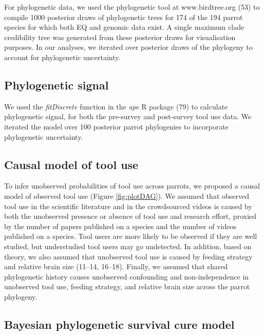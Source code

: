 \documentclass[
  man, donotrepeattitle,floatsintext]{apa6}
\begin{document}
For phylogenetic data, we used the phylogenetic tool at www.birdtree.org
(53) to compile 1000 posterior draws of phylogenetic trees for 174 of the
194 parrot species for which both EQ and genomic data exist. A single maximum
clade credibility tree was generated from these posterior draws for
visualisation purposes. In our analyses, we iterated over posterior draws of the
phylogeny to account for phylogenetic uncertainty.

\hypertarget{phylogenetic-signal}{%
\subsection{Phylogenetic signal}\label{phylogenetic-signal}}

We used the \emph{fitDiscrete} function in the \emph{ape} R package (79) to
calculate phylogenetic signal, for both the pre-survey and post-survey tool use
data. We iterated the model over 100 posterior parrot phylogenies to incorporate
phylogenetic uncertainty.

\hypertarget{causal-model-of-tool-use}{%
\subsection{Causal model of tool use}\label{causal-model-of-tool-use}}

To infer unobserved probabilities of tool use across parrots, we proposed a
causal model of observed tool use (Figure \ref{fig:plotDAG}). We assumed that
observed tool use in the scientific literature and in the crowdsourced videos is
caused by both the unobserved presence or absence of tool use and research
effort, proxied by the number of papers published on a species and the number of
videos published on a species. Tool users are more likely to be observed if they
are well studied, but understudied tool users may go undetected. In addition,
based on theory, we also assumed that unobserved tool use is caused by feeding
strategy and relative brain size (11--14, 16--18). Finally, we
assumed that shared phylogenetic history causes unobserved confounding and
non-independence in unobserved tool use, feeding strategy, and relative brain
size across the parrot phylogeny.

\hypertarget{bayesian-phylogenetic-survival-cure-model}{%
\subsection{Bayesian phylogenetic survival cure model}\label{bayesian-phylogenetic-survival-cure-model}}
\end{document}
